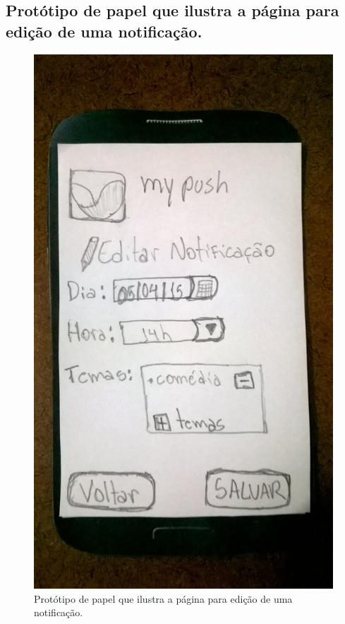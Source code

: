 \begin{apendicesenv}
    \pagebreak
    \section*{Protótipo de papel que ilustra a página para edição de uma notificação.}
    
      \begin{figure}[!htbp]
	\centering
	\includegraphics[scale=0.32, angle=-90]{editaveis/figuras/prototipo_papel_v1/editar_notificacao}
	\caption{Protótipo de papel que ilustra a página para edição de uma notificação.}
	\label{editar_notificacao_v1}
      \end{figure}
    

\end{apendicesenv}
